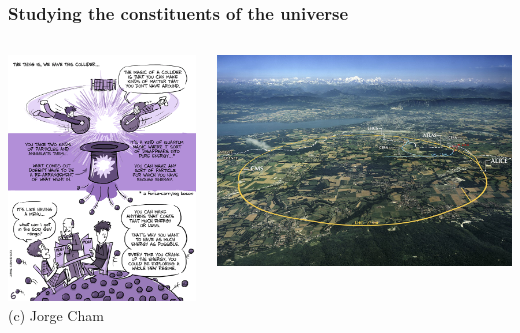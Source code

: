 \documentclass{beamer}
\begin{document}
\begin{frame}
    \frametitle{Studying the constituents of the universe}

    \begin{columns}
        \begin{column}{0.55\textwidth}
            \centering
            \includegraphics[width=\textwidth]{figures/phd1.png}\\
            {\scriptsize (c) Jorge Cham}
        \end{column}
        \begin{column}{0.4\textwidth}
            \centering
            \includegraphics[width=\textwidth]{figures/lhc1.jpg}\\

\end{column}
\end{columns}
\end{frame}
\end{document}
